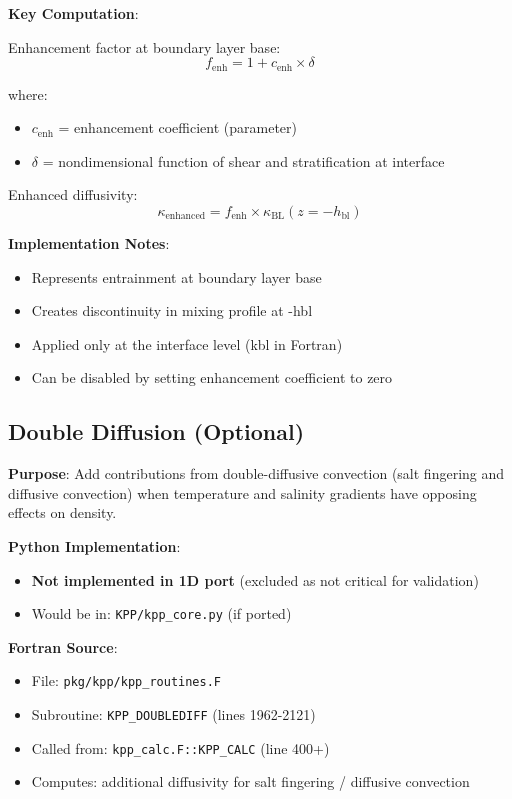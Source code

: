 \documentclass[11pt]{article}
\begin{document}
\textbf{Key Computation}:

Enhancement factor at boundary layer base:
\begin{equation}
f_{\text{enh}} = 1 + c_{\text{enh}} \times \delta
\end{equation}

where:
\begin{itemize}
    \item $c_{\text{enh}}$ = enhancement coefficient (parameter)
    \item $\delta$ = nondimensional function of shear and stratification at interface
\end{itemize}

Enhanced diffusivity:
\begin{equation}
\kappa_{\text{enhanced}} = f_{\text{enh}} \times \kappa_{\text{BL}}(z = -h_{\text{bl}})
\end{equation}

\textbf{Implementation Notes}:
\begin{itemize}
    \item Represents entrainment at boundary layer base
    \item Creates discontinuity in mixing profile at -hbl
    \item Applied only at the interface level (kbl in Fortran)
    \item Can be disabled by setting enhancement coefficient to zero
\end{itemize}

\subsection{Double Diffusion (Optional)}

\textbf{Purpose}: Add contributions from double-diffusive convection (salt fingering and diffusive convection) when temperature and salinity gradients have opposing effects on density.

\textbf{Python Implementation}:
\begin{itemize}
    \item \textbf{Not implemented in 1D port} (excluded as not critical for validation)
    \item Would be in: \verb|KPP/kpp_core.py| (if ported)
\end{itemize}

\textbf{Fortran Source}:
\begin{itemize}
    \item File: \verb|pkg/kpp/kpp_routines.F|
    \item Subroutine: \verb|KPP_DOUBLEDIFF| (lines 1962-2121)
    \item Called from: \verb|kpp_calc.F::KPP_CALC| (line 400+)
    \item Computes: additional diffusivity for salt fingering / diffusive convection
\end{itemize}
\end{document}
